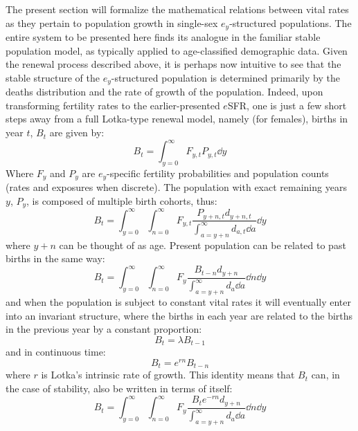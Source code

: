  \FloatBarrier
The present section will formalize the mathematical relations between vital
rates as they pertain to population growth in single-sex $e_y$-structured
populations. The entire system to be presented here finds its analogue in the
familiar stable population model, as typically applied to age-classified
demographic data. Given the renewal process described above, it is perhaps now
intuitive to see that the stable structure of the $e_y$-structured population is determined
primarily by the deaths distribution and the rate of growth of the
population. Indeed, upon transforming fertility rates to the earlier-presented
$e$SFR, one is just a few short steps away from a full Lotka-type renewal
model, namely (for females), births in year $t$, $B_{t}$ are given by:
\begin{equation}
B_t = \int_{y=0}^\infty F_{y,t} P_{y,t} \dd y
\end{equation}
Where $F_y$ and $P_y$ are $e_y$-specific fertility probabilities and population
counts (rates and exposures when discrete). The population with
exact remaining years $y$, $P_y$, is composed of multiple birth cohorts, thus:
\begin{equation}
B_t = \int_{y=0}^\infty \int_{n=0}^\infty F_{y,t}
\frac{P_{y+n,t}d_{y+n,t}}{\int_{a=y+n}^\infty d_{a,t} \dd a} \dd y
\end{equation}
where $y+n$ can be thought of as age. Present population can be related to past
births in the same way:
\begin{equation}
B_t = \int_{y=0}^\infty \int_{n=0}^\infty F_y
\frac{B_{t-n}d_{y+n}}{\int_{a=y+n}^\infty d_a \dd a} \dd n \dd y
\end{equation}
and when the population is subject to constant vital rates it will eventually
enter into an invariant structure, where the births in each year are related to
the births in the previous year by a constant proportion:
\begin{equation}
B_t = \lambda B_{t-1}
\end{equation}
and in continuous time:
\begin{equation}
B_t = e^{rn}B_{t-n}
\end{equation}
where $r$ is Lotka's intrinsic rate of growth. This identity means that $B_t$
can, in the case of stability, also be written in terms of itself:
\begin{equation}
\label{eq:exrenewal1sex}
B_t = \int_{y=0}^\infty \int_{n=0}^\infty F_y
\frac{B_{t}e^{-rn}d_{y+n}}{\int_{a=y+n}^\infty d_a \dd a} \dd n \dd y
\end{equation}
